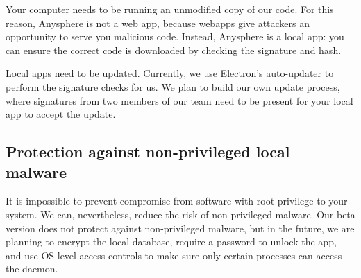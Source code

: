 Your computer needs to be running an unmodified copy of our code. For this reason, Anysphere is not a web app, because webapps give attackers an opportunity to serve you malicious code. Instead, Anysphere is a local app: you can ensure the correct code is downloaded by checking the signature and hash.



Local apps need to be updated. Currently, we use Electron's auto-updater to perform the signature checks for us. We plan to build our own update process, where signatures from two members of our team need to be present for your local app to accept the update. 


\subsection{Protection against non-privileged local malware}

It is impossible to prevent compromise from software with root privilege to your system. We can, nevertheless, reduce the risk of non-privileged malware. Our beta version does not protect against non-privileged malware, but in the future, we are planning to encrypt the local database, require a password to unlock the app, and use OS-level access controls to make sure only certain processes can access the daemon.

